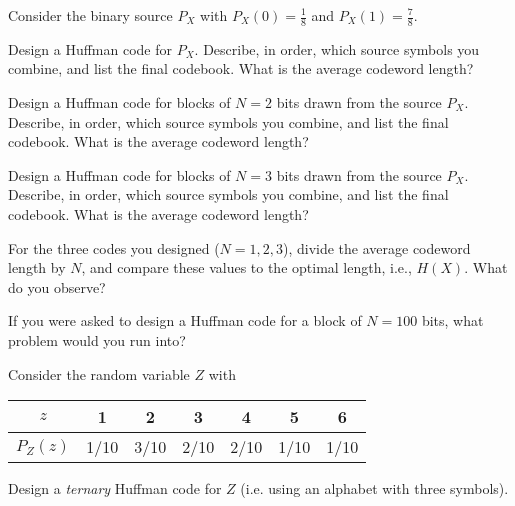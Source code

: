 \documentclass[a4paper,10pt,landscape,twocolumn]{scrartcl}
\begin{document}
\begin{exercise}
	\begin{subex}[(4pt)]
    Consider the binary source $P_X$ with $P_X(0) = \frac{1}{8}$ and $P_X(1) = \frac{7}{8}$.
    
    Design a Huffman code for $P_X$. Describe, in order, which source symbols you combine, and list the final codebook. What is the average codeword length?
	\end{subex}
\begin{subex}[(4pt)]
	Design a Huffman code for blocks of $N=2$ bits drawn from the source $P_X$. Describe, in order, which source symbols you combine, and list the final codebook. What is the average codeword length?
\end{subex}
\begin{subex}[(4pt)]
	Design a Huffman code for blocks of $N=3$ bits drawn from the source $P_X$. Describe, in order, which source symbols you combine, and list the final codebook. What is the average codeword length?
\end{subex}
\begin{subex}[(4pt)]
	For the three codes you designed ($N=1,2,3$), divide the average codeword length by $N$, and compare these values to the optimal length, i.e., $H(X)$. What do you observe?
\end{subex}
	\begin{subex}[(1pt)]
	If you were asked to design a Huffman code for a block of $N = 100$ bits, what problem would you run into?
	\end{subex}
	\begin{subex}[(2pt)]
	Consider the random variable $Z$ with
	\begin{center}
	\begin{tabular}{c | c c c c c c}
	$z$ & 1 & 2 & 3 & 4 & 5 & 6\\
	\hline
	$P_Z(z)$ & 1/10 & 3/10 & 2/10 & 2/10 & 1/10 & 1/10\\
	\end{tabular}
	\end{center}
	Design a \emph{ternary} Huffman code for $Z$ (i.e. using an alphabet with three symbols).
	\end{subex}
\end{exercise}
\end{document}
